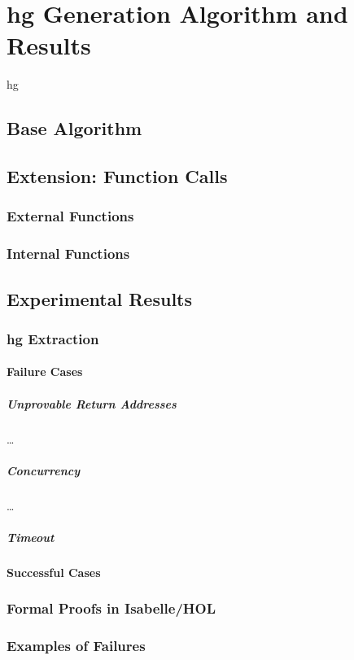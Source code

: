 \chapter{\acl*{hg} Generation Algorithm and Results}\label{ch:lattice-algorithm}

\Ac{hg}

\section{Base Algorithm}

\section{Extension: Function Calls}

\subsection{External Functions}

\subsection{Internal Functions}

\section{Experimental Results}

\subsection{\acl*{hg} Extraction}

\subsubsection{Failure Cases}

\paragraph{Unprovable Return Addresses}
\todo\dots

\paragraph{Concurrency}
\todo\dots

\paragraph{Timeout}

\subsubsection{Successful Cases}

\subsection{Formal Proofs in Isabelle/HOL}

\subsection{Examples of Failures}
